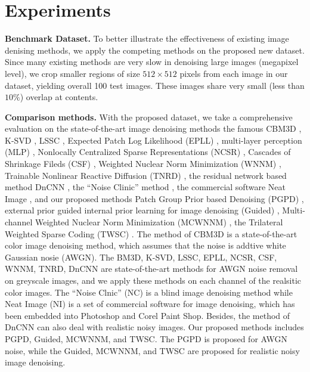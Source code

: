 \section{Experiments}

\textbf{Benchmark Dataset.} To better illustrate the effectiveness of existing image denising methods, we apply the competing methods on the proposed new dataset. Since many existing methods are very slow in denoising large images (megapixel level), we crop smaller regions of size $512\times512$ pixels from each image in our dataset, yielding overall 100 test images. These images share very small (less than $10\%$) overlap at contents.

\textbf{Comparison methods.} With the proposed dataset, we take a comprehensive evaluation on the state-of-the-art image denoising methods the famous CBM3D \cite{cbm3d}, K-SVD \cite{ksvd}, LSSC \cite{lssc}, Expected Patch Log Likelihood (EPLL) \cite{epll}, multi-layer perception (MLP) \cite{mlp}, Nonlocally Centralized Sparse Representations (NCSR) \cite{ncsr}, Cascades of Shrinkage Fileds (CSF) \cite{csf}, Weighted Nuclear Norm Minimization (WNNM) \cite{wnnm}, Trainable Nonlinear Reactive Diffusion (TNRD) \cite{tnrd}, the residual network based method DnCNN \cite{dncnn}, the ``Noise Clinic'' method \cite{noiseclinic,ncwebsite}, the commercial software Neat Image \cite{neatimage}, and our proposed methods Patch Group Prior based Denoising (PGPD) \cite{pgpd}, external prior guided internal prior learning for image denoising (Guided) \cite{guided}, Multi-channel Weighted Nuclear Norm Minimization (MCWNNM) \cite{mcwnnm}, the Trilateral Weighted Sparse Coding (TWSC) \cite{twsc}. The method of CBM3D is a state-of-the-art color image denoising method, which assumes that the noise is addtive white Gaussian nosie (AWGN). The BM3D, K-SVD, LSSC, EPLL, NCSR, CSF, WNNM, TNRD, DnCNN are state-of-the-art methods for AWGN noise removal on greyscale images, and we apply these methods on each channel of the realsitic color images.  The ``Noise Clnic'' (NC) is a blind image denoising method while Neat Image (NI) is a set of commercial software for image denoising, which has been embedded into Photoshop and Corel Paint Shop. Besides, the method of DnCNN \cite{dncnn} can also deal with realistic noisy images. Our proposed methods includes PGPD, Guided, MCWNNM, and TWSC. The PGPD is proposed for AWGN noise, while the Guided, MCWNNM, and TWSC are proposed for realistic noisy image denoising.

